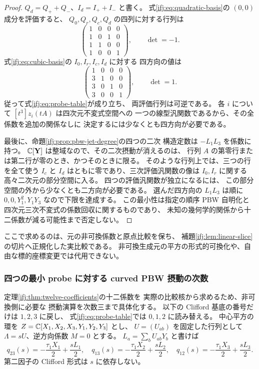 \begin{proof}
$Q_d=Q_++Q_-$、$I_d=I_++I_-$ と書く。
式\eqref{ifj:eq:quadratic-basis}の $(0,0)$ 成分を評価すると、
$Q_0,Q_r,Q_c,Q_d$ の四列に対する行列は
\[
 \begin{pmatrix}
 1&0&0&0\\
 1&0&1&0\\
 1&1&0&0\\
 1&0&0&1
 \end{pmatrix},
 \qquad \det=-1.
\]
式\eqref{ifj:eq:cubic-basis}の $I_0,I_r,I_c,I_d$ に対する
四方向の値は
\[
 \begin{pmatrix}
 1&0&0&0\\
 3&1&0&0\\
 3&0&1&0\\
 3&0&0&1
 \end{pmatrix},
 \qquad \det=1.
\]
従って式\eqref{ifj:eq:probe-table}が成り立ち、
両評価行列は可逆である。
各 $i$ について $[t^3]z_i(tA)$ は四次元不変式空間への
一つの線型汎関数であるから、その全係数を追加の関係なしに
決定するには少なくとも四方向が必要である。

最後に、命題\ref{ifj:prop:pbw-jet-degree}の四つの二次
構造定数は $-L_1L_3$ を係数に持つ。
$\mathbb C[\mathbf Y]$ は整域なので、その二次摂動が消えるのは、
行列 $A$ の第零行または第二行が零のとき、かつそのときに限る。
そのような行列上では、三つの行を全て使う
$I_c$ と $I_d$ はともに零であり、三次評価汎関数の像は
$I_0,I_r$ に関する高々二次元の部分空間に入る。
四つの評価汎関数が独立になるには、
この部分空間の外から少なくとも二方向が必要である。
選んだ四方向の $L_1L_3$ は順に
$0,0,Y_1^2,Y_1Y_3$ なので下限を達成する。
この最小性は指定の順序 PBW 自明化と
四次元三次不変式の係数回収に関するものであり、
未知の幾何学的関係から十二係数が減る可能性まで否定しない。
\end{proof}

ここで求めるのは、元の非可換係数と原点比較を保ち、
補題\ref{ifj:lem:linear-slice}の切片へ正規化した実比較である。
非可換生成元の平方の形式的可換化や、自由な標的座標変更では代用できない。

\subsubsection{四つの最小 probe に対する curved PBW 摂動の次数}
\label{ifj:subsubsec:pbw-transfer}

定理\ref{ifj:thm:twelve-coefficients}の十二係数を
実際の比較核から求めるため、非可換側に必要な
摂動演算を次数三まで具体化する。
以下の Clifford 基底の番号だけは $1,2,3$ に戻し、
式\eqref{ifj:eq:probe-table}では $0,1,2$ に読み替える。
中心平方の環を $Z=\mathbb C[X_1,X_2,X_3,Y_1,Y_2,Y_3]$ とし、
$U=(U_{ab})$ を固定した行列として
$\Lambda=sU$、逆方向係数 $M=0$ とする。
$L_a=\sum_bU_{ab}Y_b$ と書けば
\begin{equation}\label{ifj:eq:pbw-varying-q}
 q_{23}(s)=-\frac{\tau_1X_1}{2}+\frac{sL_1}{2},\quad
 q_{13}(s)=-\frac{\tau_1X_2}{2}+\frac{sL_2}{2},\quad
 q_{12}(s)=-\frac{\tau_1X_3}{2}+\frac{sL_3}{2}.
\end{equation}
第二因子の Clifford 形式は $s$ に依存しない。

